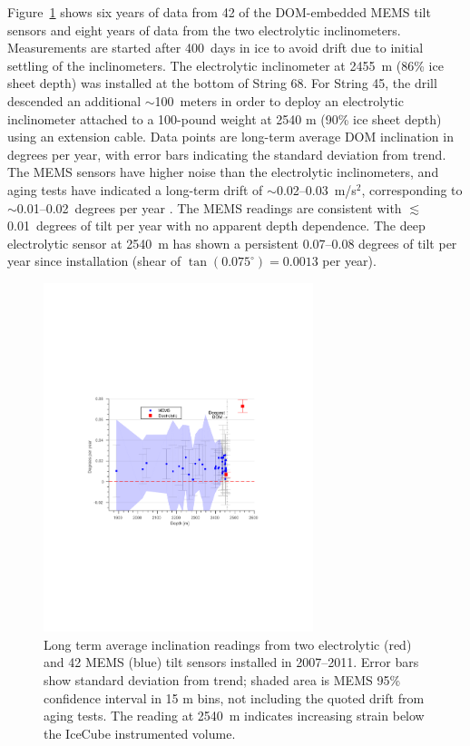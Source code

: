 Figure~\ref{fig:tilt} shows
six years of data from 42 of the DOM-embedded MEMS tilt sensors and
eight years of data from the two electrolytic inclinometers. Measurements are
started after 400~days in ice to avoid  
drift due to initial settling of the inclinometers. The electrolytic
inclinometer at \qty{2455}{m} (86\% ice sheet depth) was 
installed at the bottom of String 68.  For String 45, the drill
descended an additional $\sim$\qty{100}{meters} in order to deploy an
electrolytic inclinometer attached to a 100-pound weight at 2540 m
(90\% ice sheet depth) using an extension cable. Data
points are long-term average DOM inclination in degrees per year, with error
bars indicating the standard deviation from trend.  The MEMS sensors have
higher noise than the electrolytic inclinometers, and aging tests have indicated a long-term
drift of $\sim$\numrange[range-phrase = --]{0.02}{0.03}~m/s$^2$, corresponding to
$\sim$\numrange[range-phrase = --]{0.01}{0.02}~degrees per year
\cite{inclinometer_comm}. The MEMS readings are consistent with
$\lesssim$\qty{0.01}{degrees} of tilt per year with no apparent depth
dependence.  The deep electrolytic sensor 
at \qty{2540}{m} has shown a persistent \numrange[range-phrase =
  --]{0.07}{0.08} degrees of tilt per year since installation (shear
  of $\tan(0.075^\circ) = 0.0013$
per year).

\begin{figure}[!ht]
	\centering
    \includegraphics[width=0.7\textwidth]{graphics/geometry/tilt5.pdf}
	\caption{Long term average inclination readings from two electrolytic
      (red) and 42 MEMS (blue) tilt sensors installed in 2007--2011.  Error
      bars show standard deviation from trend; shaded area is MEMS 95\%
      confidence interval in 15 m bins, not including the quoted drift
      from aging tests.  The reading at \qty{2540}{m}
      indicates increasing strain below the IceCube instrumented volume.}
	\label{fig:tilt}
\end{figure}

